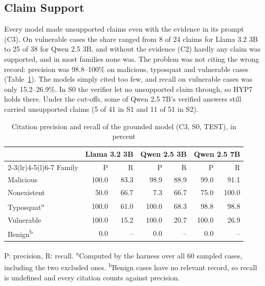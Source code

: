 \documentclass[conference]{IEEEtran}
\begin{document}
\subsection{Claim Support}
Every model made unsupported claims even with the evidence in its prompt (C3). On vulnerable
cases the share ranged from 8 of 24 claims for Llama 3.2 3B to 25 of 38 for Qwen 2.5 3B, and without the evidence
(C2) hardly any claim was supported, and in most families none was. The problem was not citing the wrong record: precision was 98.8--100\% on
malicious, typosquat and vulnerable cases (Table~\ref{tab:cite}). The models simply cited too few, and recall on
vulnerable cases was only 15.2--26.9\%. In S0 the verifier let no unsupported claim through, so HYP7 holds there.
Under the cut-offs, some of Qwen 2.5 7B's verified answers still carried unsupported claims (5 of 41 in S1 and 11
of 51 in S2).

\begin{table}[t]
\caption{Citation precision and recall of the grounded model (C3, S0, TEST), in percent}
\label{tab:cite}
\centering
\small
\setlength{\tabcolsep}{4pt}
\begin{tabular}{@{}lrrrrrr@{}}
\toprule
 & \multicolumn{2}{c}{Llama 3.2 3B} & \multicolumn{2}{c}{Qwen 2.5 3B} & \multicolumn{2}{c}{Qwen 2.5 7B} \\
\cmidrule(lr){2-3}\cmidrule(lr){4-5}\cmidrule(l){6-7}
Family & P & R & P & R & P & R \\
\midrule
Malicious & 100.0 & 83.3 & 98.9 & 88.9 & 99.0 & 91.1 \\
Nonexistent & 50.0 & 66.7 & 7.3 & 66.7 & 75.0 & 100.0 \\
Typosquat\textsuperscript{a} & 100.0 & 61.0 & 100.0 & 68.3 & 98.8 & 98.8 \\
Vulnerable & 100.0 & 15.2 & 100.0 & 20.7 & 100.0 & 26.9 \\
Benign\textsuperscript{b} & 0.0 & -- & 0.0 & -- & 0.0 & -- \\
\bottomrule
\end{tabular}

\vspace{2pt}
\parbox{\columnwidth}{\scriptsize P: precision, R: recall. \textsuperscript{a}Computed by the harness over all 60
sampled cases, including the two excluded ones. \textsuperscript{b}Benign cases have no relevant record, so recall
is undefined and every citation counts against precision.}
\end{table}
\end{document}
